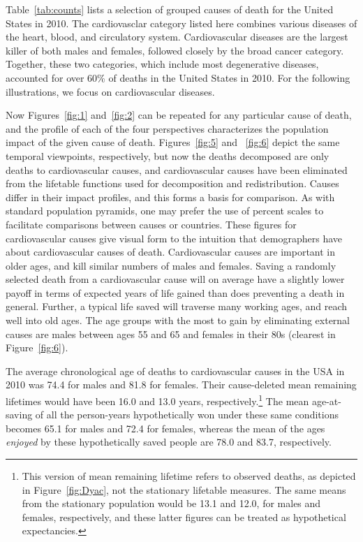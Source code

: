 \documentclass{article}
\begin{document}
Table~\ref{tab:counts} lists a selection of grouped causes of death for the
United States in 2010. The cardiovasclar category listed here combines
various diseases of the heart, blood, and circulatory system. Cardiovascular
diseases are the largest killer of both males and females, followed closely by
the broad cancer category. Together, these two categories, which include most
degenerative diseases, accounted for over 60\% of deaths in the United States in
2010. For the following illustrations, we focus on cardiovascular
diseases.

Now Figures~\ref{fig:1} and~\ref{fig:2}
can be repeated for any particular cause of death, and the profile of each of the four perspectives
characterizes the population impact of the given cause of death.
Figures~\ref{fig:5} and~ \ref{fig:6} depict the same temporal viewpoints,
respectively, but now the deaths decomposed are only deaths to cardiovascular
causes, and cardiovascular causes have been eliminated from the lifetable functions used for decomposition and
 redistribution. Causes differ in their impact profiles, and this forms a
 basis for comparison. As with standard population pyramids, one may prefer the
 use of percent scales to facilitate comparisons between causes or countries. These
 figures for cardiovascular causes give visual form to the intuition that demographers
 have about cardiovascular causes of death. Cardiovascular causes are important in
 older ages, and kill similar numbers of males and females. Saving a randomly
 selected death from a cardiovascular cause will on average have a slightly
 lower payoff in terms of expected years of life gained than does preventing a death in general. Further, a typical life saved will traverse many working ages, and reach well into old
 ages.
 The age groups with the most to gain by eliminating external causes are males
between ages 55 and 65 and females in their 80s (clearest in
Figure~\ref{fig:6}).
 
 The average chronological age of deaths to cardiovascular causes in the USA in
 2010 was 74.4 for males and 81.8 for females. Their cause-deleted mean
 remaining lifetimes would have been 16.0 and 13.0 years,
 respectively.\footnote{This version of mean remaining lifetime refers to
 observed deaths, as depicted in Figure~\ref{fig:Dyac}, not the stationary
 lifetable measures. The same means from the stationary population would be 13.1
 and 12.0, for males and females, respectively, and these latter figures can
 be treated as hypothetical expectancies.} The mean age-at-saving of all the
 person-years hypothetically won under these same conditions becomes 65.1 for males and 72.4 for females, whereas the mean of the ages \textit{enjoyed} by these hypothetically saved people are 78.0 and 83.7,
 respectively. 
 
\end{document}
